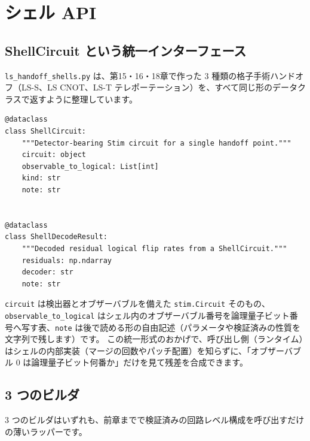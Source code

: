\section{シェル API}\label{sec:shell_api}

\subsection{ShellCircuit という統一インターフェース}

\texttt{ls\_handoff\_shells.py} は、第15・16・18章で作った 3 種類の格子手術ハンドオフ（LS-S、LS CNOT、LS-T テレポーテーション）を、すべて同じ形のデータクラスで返すように整理しています。

\begin{lstlisting}[caption={ShellCircuit と ShellDecodeResult（src/stages/02\_circuit\_level/src/ftqc/ls\_handoff\_shells.py）}]
@dataclass
class ShellCircuit:
    """Detector-bearing Stim circuit for a single handoff point."""
    circuit: object
    observable_to_logical: List[int]
    kind: str
    note: str


@dataclass
class ShellDecodeResult:
    """Decoded residual logical flip rates from a ShellCircuit."""
    residuals: np.ndarray
    decoder: str
    note: str
\end{lstlisting}

\texttt{circuit} は検出器とオブザーバブルを備えた \texttt{stim.Circuit} そのもの、\texttt{observable\_to\_logical} はシェル内のオブザーバブル番号を論理量子ビット番号へ写す表、\texttt{note} は後で読める形の自由記述（パラメータや検証済みの性質を文字列で残します）です。
この統一形式のおかげで、呼び出し側（ランタイム）はシェルの内部実装（マージの回数やパッチ配置）を知らずに、「オブザーバブル 0 は論理量子ビット何番か」だけを見て残差を合成できます。

\subsection{3 つのビルダ}

3 つのビルダはいずれも、前章までで検証済みの回路レベル構成を呼び出すだけの薄いラッパーです。

